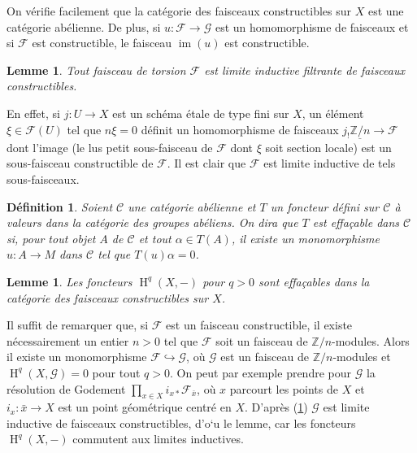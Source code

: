 \documentclass{book}
\DeclareMathOperator{\h}{H}
\DeclareMathOperator{\im}{im}
\newcommand{\cF}{\mathcal{F}}
\newcommand{\cG}{\mathcal{G}}
\newcommand{\dZ}{\mathbb{Z}}
\newcommand{\sC}{\mathscr{C}}
\newcommand{\const}[1]{\underline{#1}}
\newtheorem{definition}[subsubsection]{Définition}
\newtheorem{lemma}[subsubsection]{Lemme}
\begin{document}
On vérifie facilement que la catégorie des faisceaux constructibles sur $X$ 
est une catégorie abélienne. De plus, si $u:\cF\to \cG$ est un homomorphisme de 
faisceaux et si $\cF$ est constructible, le faisceau $\im(u)$ est constructible.





\begin{lemma}\label{I:4-3-3}
Tout faisceau de torsion $\cF$ est limite inductive filtrante de faisceaux 
constructibles.
\end{lemma}

En effet, si $j:U\to X$ est un schéma étale de type fini sur $X$, un 
élément $\xi\in \cF(U)$ tel que $n\xi=0$ définit un homomorphisme de 
faisceaux $j_! \const{\dZ/n}\to \cF$ dont l'image (le lus petit sous-faisceau de 
$\cF$ dont $\xi$ soit section locale) est un sous-faisceau constructible de $\cF$. 
Il est clair que $\cF$ est limite inductive de tels sous-faisceaux.





\begin{definition}\label{I:4-3-4}
Soient $\sC$ une catégorie abélienne et $T$ un foncteur défini sur $\sC$ 
à valeurs dans la catégorie des groupes abéliens. On dira que $T$ est 
\emph{effaçable} dans $\sC$ si, pour tout objet $A$ de $\sC$ et tout 
$\alpha\in T(A)$, il existe un monomorphisme $u:A\to M$ dans $\sC$ tel que 
$T(u)\alpha = 0$. 
\end{definition}





\begin{lemma}\label{I:4-3-5}
Les foncteurs $\h^q(X,-)$ pour $q>0$ sont effaçables dans la catégorie des 
faisceaux constructibles sur $X$.
\end{lemma}

Il suffit de remarquer que, si $\cF$ est un faisceau constructible, il existe 
nécessairement un entier $n>0$ tel que $\cF$ soit un faisceau de 
$\dZ/n$-modules. Alors il existe un monomorphisme $\cF\hookrightarrow \cG$, où 
$\cG$ est un faisceau de $\dZ/n$-modules et $\h^q(X,\cG) = 0$ pour tout $q>0$.  
On peut par exemple prendre pour $\cG$ la résolution de Godement 
$\prod_{x\in X} i_{x*} \cF_{\bar x}$, où $x$ parcourt les points de $X$ et 
$i_x:\bar x\to X$ est un point géométrique centré en $X$. D'après 
(\ref{I:4-3-3}) $\cG$ est limite inductive de faisceaux constructibles, d'o`u le 
lemme, car les foncteurs $\h^q(X,-)$ commutent aux limites inductives. 
\end{document}
